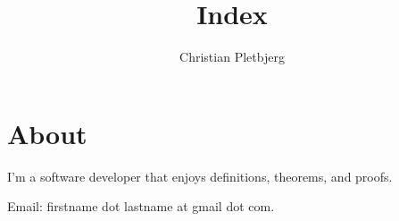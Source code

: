 \documentclass{article}
\title{Index}
\author{Christian Pletbjerg}
\begin{document}
\section{About}
I'm a software developer that enjoys definitions, theorems, and proofs.

Email: firstname dot lastname at gmail dot com.

\end{document}
